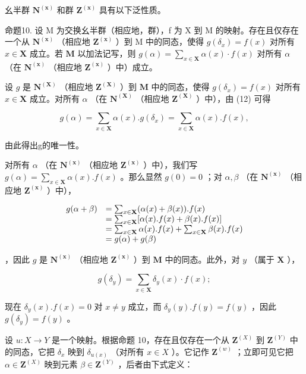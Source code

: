 幺半群 \(\mathbf{N}^{(\mathbf{x})}\) 和群 \(\mathbf{Z}^{(\mathbf{x})}\) 具有以下泛性质。

命题10. 设 M 为交换幺半群（相应地，群），f 为 X 到 M 的映射。存在且仅存在一个从 \(\mathbf{N}^{(\mathbf{x})}\) （相应地 \(\mathbf{Z}^{(\mathbf{x})}\) ）到 M 中的同态，使得 \(g(\delta_x) = f(x)\) 对所有 \(x \in \mathbf{X}\) 成立。若 \(\mathbf{M}\) 以加法记写，则 \(g(\alpha) = \sum_{x \in \mathbf{X}} \alpha(x) \cdot f(x)\) 对所有 \(\alpha\) （在 \(\mathbf{N}^{(\mathbf{x})}\) （相应地 \(\mathbf{Z}^{(\mathbf{x})}\) ）中）成立。

设 \(g\) 是 \(\mathbf{N}^{(\mathbf{X})}\) （相应地 \(\mathbf{Z}^{(\mathbf{X})}\) ）到 \(\mathbf{M}\) 中的同态，使得 \(g(\delta_x) = f(x)\) 对所有 \(x \in \mathbf{X}\) 成立。对所有 \(\alpha\) （在 \(\mathbf{N}^{(\mathbf{X})}\) （相应地 \(\mathbf{Z}^{(\mathbf{X})}\) ）中），由 (12) 可得

\[
g (\alpha) = \sum_ {x \in \mathbf {X}} \alpha (x). g (\delta_ {x}) = \sum_ {x \in \mathbf {X}} \alpha (x). f (x),
\]

由此得出g的唯一性。

对所有 \(\alpha\) （在 \(\mathbf{N}^{(\mathbf{x})}\) （相应地 \(\mathbf{Z}^{(\mathbf{x})}\) ）中），我们写 \(g(\alpha) = \sum_{x\in \mathbf{X}}\alpha (x).f(x)\) 。那么显然 \(g(0) = 0\) ；对 \(\alpha, \beta\) （在 \(\mathbf{N}^{(\mathbf{x})}\) （相应地 \(\mathbf{Z}^{(\mathbf{x})}\) ）中），

\[
\begin{array}{r l} g (\alpha + \beta) & = \sum_ {x \in \mathbf {X}} (\alpha (x) + \beta (x)). f (x) \\ & = \sum_ {x \in \mathbf {X}} [ \alpha (x). f (x) + \beta (x). f (x) ] \\ & = \sum_ {x \in \mathbf {X}} \alpha (x). f (x) + \sum_ {x \in \mathbf {X}} \beta (x). f (x) \\ & = g (\alpha) + g (\beta) \end{array}
\]

，因此 \(g\) 是 \(\mathbf{N}^{(\mathbf{x})}\) （相应地 \(\mathbf{Z}^{(\mathbf{x})}\) ）到 \(\mathbf{M}\) 中的同态。此外，对 \(y\) （属于 \(\mathbf{X}\) ），

\[
g (\delta_ {y}) = \sum_ {x \in \mathbf {X}} \delta_ {y} (x) \cdot f (x);
\]

现在 \(\delta_y(x).f(x) = 0\) 对 \(x\neq y\) 成立，而 \(\delta_y(y).f(y) = f(y)\) ，因此 \(g(\delta_y) = f(y)\) 。

设 \(u: X \to Y\) 是一个映射。根据命题 10，存在且仅存在一个从 \(\mathbf{Z}^{(X)}\) 到 \(\mathbf{Z}^{(Y)}\) 中的同态，它把 \(\delta_x\) 映到 \(\delta_{u(x)}\) （对所有 \(x \in X\) ）。它记作 \(\mathbf{Z}^{(w)}\) ；立即可见它把 \(\alpha \in \mathbf{Z}^{(X)}\) 映到元素 \(\beta \in \mathbf{Z}^{(Y)}\) ，后者由下式定义：

